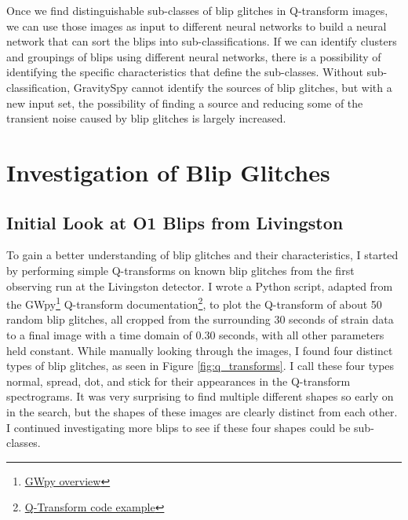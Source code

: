\documentclass[a4paper]{article}
\begin{document}
Once we find distinguishable sub-classes of blip glitches in Q-transform images, we can use those images as input to different neural networks to build a neural network that can sort the blips into sub-classifications. If we can identify clusters and groupings of blips using different neural networks, there is a possibility of identifying the specific characteristics that define the sub-classes. Without sub-classification, GravitySpy cannot identify the sources of blip glitches, but with a new input set, the possibility of finding a source and reducing some of the transient noise caused by blip glitches is largely increased. 

\section{Investigation of Blip Glitches}

\subsection{Initial Look at O1 Blips from Livingston} \label{investigation}

To gain a better understanding of blip glitches and their characteristics, I started by performing simple Q-transforms on known blip glitches from the first observing run at the Livingston detector. I wrote a Python script, adapted from the GWpy\footnote{\href{https://gwpy.github.io/docs/stable/overview.html}{GWpy overview}} Q-transform documentation\footnote{\href{https://gwpy.github.io/docs/stable/examples/timeseries/qscan.html}{Q-Transform code example}}, to plot the Q-transform of about 50 random blip glitches, all cropped from the surrounding 30 seconds of strain data to a final image with a time domain of 0.30 seconds, with all other parameters held constant. While manually looking through the images, I found four distinct types of blip glitches, as seen in Figure \ref{fig:q_transforms}. I call these four types normal, spread, dot, and stick for their appearances in the Q-transform spectrograms. It was very surprising to find multiple different shapes so early on in the search, but the shapes of these images are clearly distinct from each other. I continued investigating more blips to see if these four shapes could be sub-classes.
\end{document}

